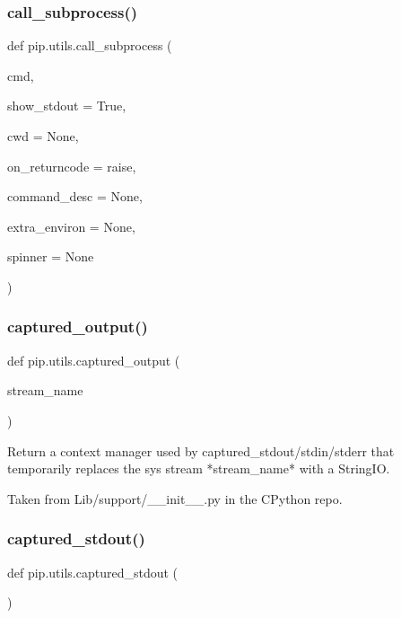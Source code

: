 \subsubsection{\texorpdfstring{call\+\_\+subprocess()}{call\_subprocess()}}
{\footnotesize\ttfamily def pip.\+utils.\+call\+\_\+subprocess (\begin{DoxyParamCaption}\item[{}]{cmd,  }\item[{}]{show\+\_\+stdout = {\ttfamily True},  }\item[{}]{cwd = {\ttfamily None},  }\item[{}]{on\+\_\+returncode = {\ttfamily \textquotesingle{}raise\textquotesingle{}},  }\item[{}]{command\+\_\+desc = {\ttfamily None},  }\item[{}]{extra\+\_\+environ = {\ttfamily None},  }\item[{}]{spinner = {\ttfamily None} }\end{DoxyParamCaption})}

\mbox{\label{namespacepip_1_1utils_a71f2e214228d8d369846d11c885d6eb6}} 
\subsubsection{\texorpdfstring{captured\+\_\+output()}{captured\_output()}}
{\footnotesize\ttfamily def pip.\+utils.\+captured\+\_\+output (\begin{DoxyParamCaption}\item[{}]{stream\+\_\+name }\end{DoxyParamCaption})}

\begin{DoxyVerb}Return a context manager used by captured_stdout/stdin/stderr
that temporarily replaces the sys stream *stream_name* with a StringIO.

Taken from Lib/support/__init__.py in the CPython repo.
\end{DoxyVerb}
 \mbox{\label{namespacepip_1_1utils_a45726d43a698bf987a189ce26d0ddedd}} 
\subsubsection{\texorpdfstring{captured\+\_\+stdout()}{captured\_stdout()}}
{\footnotesize\ttfamily def pip.\+utils.\+captured\+\_\+stdout (\begin{DoxyParamCaption}{ }\end{DoxyParamCaption})}

